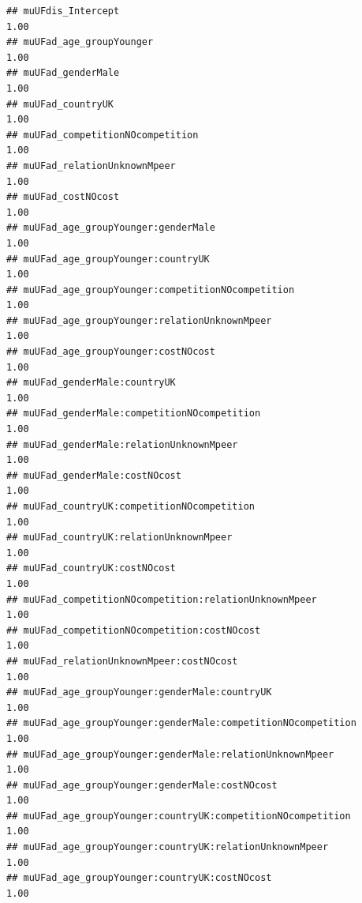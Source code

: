\documentclass[
]{article}
\begin{document}
\begin{verbatim}
## muUFdis_Intercept                                                                 1.00
## muUFad_age_groupYounger                                                           1.00
## muUFad_genderMale                                                                 1.00
## muUFad_countryUK                                                                  1.00
## muUFad_competitionNOcompetition                                                   1.00
## muUFad_relationUnknownMpeer                                                       1.00
## muUFad_costNOcost                                                                 1.00
## muUFad_age_groupYounger:genderMale                                                1.00
## muUFad_age_groupYounger:countryUK                                                 1.00
## muUFad_age_groupYounger:competitionNOcompetition                                  1.00
## muUFad_age_groupYounger:relationUnknownMpeer                                      1.00
## muUFad_age_groupYounger:costNOcost                                                1.00
## muUFad_genderMale:countryUK                                                       1.00
## muUFad_genderMale:competitionNOcompetition                                        1.00
## muUFad_genderMale:relationUnknownMpeer                                            1.00
## muUFad_genderMale:costNOcost                                                      1.00
## muUFad_countryUK:competitionNOcompetition                                         1.00
## muUFad_countryUK:relationUnknownMpeer                                             1.00
## muUFad_countryUK:costNOcost                                                       1.00
## muUFad_competitionNOcompetition:relationUnknownMpeer                              1.00
## muUFad_competitionNOcompetition:costNOcost                                        1.00
## muUFad_relationUnknownMpeer:costNOcost                                            1.00
## muUFad_age_groupYounger:genderMale:countryUK                                      1.00
## muUFad_age_groupYounger:genderMale:competitionNOcompetition                       1.00
## muUFad_age_groupYounger:genderMale:relationUnknownMpeer                           1.00
## muUFad_age_groupYounger:genderMale:costNOcost                                     1.00
## muUFad_age_groupYounger:countryUK:competitionNOcompetition                        1.00
## muUFad_age_groupYounger:countryUK:relationUnknownMpeer                            1.00
## muUFad_age_groupYounger:countryUK:costNOcost                                      1.00

\end{verbatim}
\end{document}

